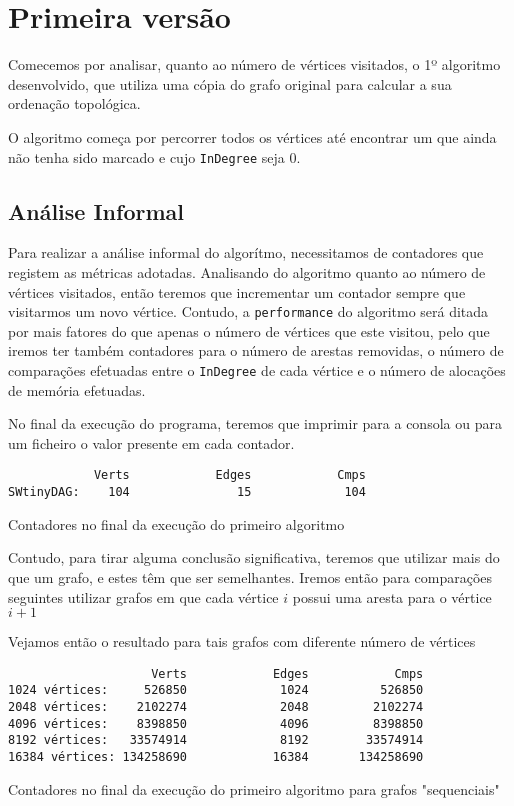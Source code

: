 \section{Primeira versão}
Comecemos por analisar, quanto ao número de vértices visitados, o 1º algoritmo desenvolvido, que utiliza
uma cópia do grafo original para calcular a sua ordenação
topológica. 

O algoritmo começa por percorrer todos os vértices até encontrar
um que ainda não tenha sido marcado e cujo \verb|InDegree| seja
0. 


\subsection{Análise Informal}

Para realizar a análise informal do algorítmo, necessitamos de
contadores que registem as métricas adotadas. Analisando do
algoritmo quanto ao número de vértices visitados, então teremos
que incrementar um contador sempre que visitarmos um novo
vértice. Contudo, a \verb|performance| do algoritmo será ditada
por mais fatores do que apenas o número de vértices que este
visitou, pelo que iremos ter também contadores para o número de
arestas removidas, o número de comparações efetuadas entre o
\verb|InDegree| de cada vértice e o número de alocações de
memória efetuadas.

No final da execução do programa, teremos que imprimir para a
consola ou para um ficheiro o valor presente em cada contador.

\begin{listing}[H]
\centering
\begin{verbatim}
            Verts	         Edges	          Cmps
SWtinyDAG:    104	            15	           104
\end{verbatim}
\caption{Contadores no final da execução do primeiro algoritmo}
\end{listing}

Contudo, para tirar alguma conclusão significativa, teremos que
utilizar mais do que um grafo, e estes têm que ser semelhantes.
Iremos então para comparações seguintes utilizar grafos em que
cada vértice $i$ possui uma aresta para o vértice $i+1$


Vejamos então o resultado para tais grafos com diferente número
de vértices

\begin{listing}[H]
\centering
\begin{verbatim}
                    Verts	         Edges	          Cmps
1024 vértices:     526850	          1024	        526850
2048 vértices:    2102274	          2048	       2102274
4096 vértices:    8398850	          4096	       8398850
8192 vértices:   33574914	          8192	      33574914
16384 vértices: 134258690	         16384	     134258690
\end{verbatim}
\caption{Contadores no final da execução do primeiro algoritmo
para grafos "sequenciais"}
\end{listing}

